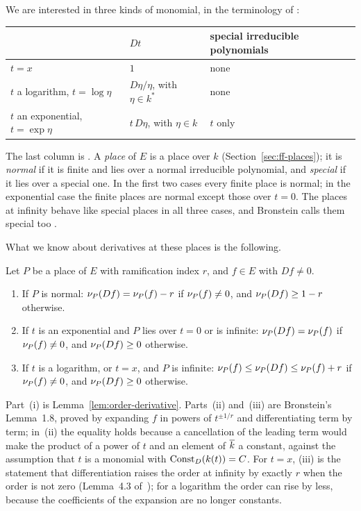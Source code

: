 We are interested in three kinds of monomial, in the terminology of
:
\begin{center}
\begin{tabular}{@{}lll@{}}
\toprule
 & $Dt$ & special irreducible polynomials \\
\midrule
$t = x$ & $1$ & none \\
$t$ a logarithm, $t = \log \eta$ & $D\eta/\eta$, with $\eta \in k^*$ & none \\
$t$ an exponential, $t = \exp \eta$ & $t\, D\eta$, with $\eta \in k$ & $t$ only \\
\bottomrule
\end{tabular}
\end{center}
The last column is . A \emph{place} of $E$ is a
place over $k$ (Section~\ref{sec:ff-places}); it is \emph{normal} if it is
finite and lies over a normal irreducible polynomial, and \emph{special} if
it lies over a special one. In the first two cases every finite place is
normal; in the exponential case the finite places are normal except those
over $t = 0$. The places at infinity behave like special places in all three
cases, and Bronstein calls them special too
\cite[\S1]{bronstein1990}.

What we know about derivatives at these places is the following.

\begin{theorem}\label{thm:orders-all-places}
Let $P$ be a place of $E$ with ramification index $r$, and $f \in E$ with $Df
\ne 0$.
\begin{enumerate}[label=\textup{(\roman*)}]
\item If $P$ is normal: $\nu_{P}(Df) = \nu_{P}(f) - r$ if $\nu_{P}(f) \ne 0$,
  and $\nu_{P}(Df) \ge 1 - r$ otherwise.
\item If $t$ is an exponential and $P$ lies over $t = 0$ or is infinite:
  $\nu_{P}(Df) = \nu_{P}(f)$ if $\nu_{P}(f) \ne 0$, and $\nu_{P}(Df) \ge 0$
  otherwise.
\item If $t$ is a logarithm, or $t = x$, and $P$ is infinite: $\nu_{P}(f) \le
  \nu_{P}(Df) \le \nu_{P}(f) + r$ if $\nu_{P}(f) \ne 0$, and $\nu_{P}(Df) \ge
  0$ otherwise.
\end{enumerate}
\end{theorem}

Part~(i) is Lemma~\ref{lem:order-derivative}. Parts~(ii) and~(iii) are
Bronstein's Lemma~1.8, proved by expanding $f$ in powers of $t^{\pm 1/r}$ and
differentiating term by term; in~(ii) the equality holds because a
cancellation of the leading term would make the product of a power of $t$
and an element of $\overline{k}$ a constant, against the assumption that $t$ is a monomial with
$\operatorname{Const}_D(k(t)) = C$. For $t = x$, (iii) is the statement that differentiation
raises the order at infinity by exactly $r$ when the order is not zero
(Lemma~4.3 of~\cite{trager1984}); for a logarithm the order can rise by less,
because the coefficients of the expansion are no longer constants.

